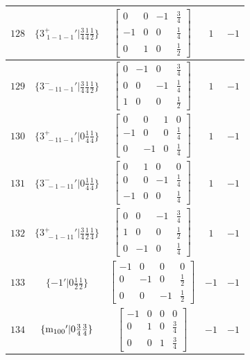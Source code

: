 \documentclass[fleqn,8pt]{jsarticle}
\begin{document}
\begin{longtable}{ccccc}
$ 128 $ & $ \{3^{+}_{\,\,1-1-1}{}'|\frac{3}{4} \frac{1}{4} \frac{1}{2}\} $ & $ \begin{bmatrix} 0 & 0 & -1 & \frac{3}{4} \\ -1 & 0 & 0 & \frac{1}{4} \\ 0 & 1 & 0 & \frac{1}{2} \end{bmatrix} $ & $ 1 $ & $ -1 $ \\ \hline
$ 129 $ & $ \{3^{-}_{\,\,-11-1}{}'|\frac{3}{4} \frac{1}{4} \frac{1}{2}\} $ & $ \begin{bmatrix} 0 & -1 & 0 & \frac{3}{4} \\ 0 & 0 & -1 & \frac{1}{4} \\ 1 & 0 & 0 & \frac{1}{2} \end{bmatrix} $ & $ 1 $ & $ -1 $ \\ \hline
$ 130 $ & $ \{3^{+}_{\,\,-11-1}{}'|0 \frac{1}{4} \frac{1}{4}\} $ & $ \begin{bmatrix} 0 & 0 & 1 & 0 \\ -1 & 0 & 0 & \frac{1}{4} \\ 0 & -1 & 0 & \frac{1}{4} \end{bmatrix} $ & $ 1 $ & $ -1 $ \\ \hline
$ 131 $ & $ \{3^{-}_{\,\,-1-11}{}'|0 \frac{1}{4} \frac{1}{4}\} $ & $ \begin{bmatrix} 0 & 1 & 0 & 0 \\ 0 & 0 & -1 & \frac{1}{4} \\ -1 & 0 & 0 & \frac{1}{4} \end{bmatrix} $ & $ 1 $ & $ -1 $ \\ \hline
$ 132 $ & $ \{3^{+}_{\,\,-1-11}{}'|\frac{3}{4} \frac{1}{2} \frac{1}{4}\} $ & $ \begin{bmatrix} 0 & 0 & -1 & \frac{3}{4} \\ 1 & 0 & 0 & \frac{1}{2} \\ 0 & -1 & 0 & \frac{1}{4} \end{bmatrix} $ & $ 1 $ & $ -1 $ \\ \hline
$ 133 $ & $ \{-1{}'|0 \frac{1}{2} \frac{1}{2}\} $ & $ \begin{bmatrix} -1 & 0 & 0 & 0 \\ 0 & -1 & 0 & \frac{1}{2} \\ 0 & 0 & -1 & \frac{1}{2} \end{bmatrix} $ & $ -1 $ & $ -1 $ \\ \hline
$ 134 $ & $ \{{\rm m}_{100}{}'|0 \frac{3}{4} \frac{3}{4}\} $ & $ \begin{bmatrix} -1 & 0 & 0 & 0 \\ 0 & 1 & 0 & \frac{3}{4} \\ 0 & 0 & 1 & \frac{3}{4} \end{bmatrix} $ & $ -1 $ & $ -1 $ \\ \hline

\end{longtable}
\end{document}
